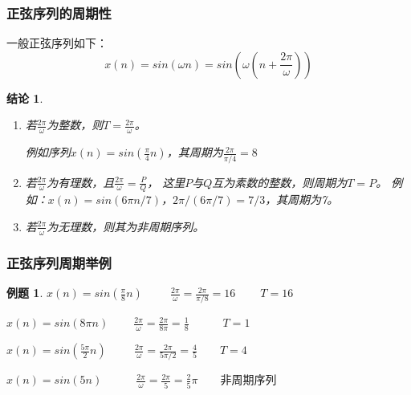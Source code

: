 \documentclass[notheorems,compress,mathserif,table]{beamer}
\newtheorem{example}{例题}
\newtheorem{jielun}{结论}
\begin{document}

\begin{frame}\frametitle{正弦序列的周期性}%
一般正弦序列如下：
$$x(n) = sin(\omega n) = sin(\omega(n+\frac{2\pi}{\omega}))$$
\begin{jielun}
\begin{enumerate}
  \item [(1)]
      若$\frac{2\pi}{\omega}$为整数，则$ T= \frac{2\pi}{\omega}$。
      \par 例如序列$x(n)=sin(\frac{\pi}{4}  n)$，其周期为$\frac{2\pi}{\pi/4}=8$
  \item [(2)]
      若$\frac{2\pi}{\omega}$为有理数，且$\frac{2\pi}{\omega}= \frac{P}{Q}$，
      这里$P$与$Q$互为素数的整数，则周期为$T=P$。
      例如：$x(n)=sin(6\pi n/7)$，$2\pi/(6\pi/7)=7/3$，其周期为7。
  \item [(3)]
      若$\frac{2\pi}{\omega}$为无理数，则其为非周期序列。
\end{enumerate}
\end{jielun}
\end{frame}



\begin{frame}\frametitle{正弦序列周期举例}%
\begin{example}

$x(n) = sin(\frac{\pi}{8}n)\:\:\quad\quad \frac{2\pi}{\omega} =\frac{2\pi}{\pi/8}=16           \:\quad\quad T = 16  $
\par\quad\newline\quad
$x(n) = sin(8\pi n)        \quad\:\quad \frac{2\pi}{\omega} =\frac{2\pi}{8\pi}= \frac{1}{8}    \qquad\quad T = 1  $
\par\quad\newline\quad
$x(n) = sin(\frac{5\pi}{2}n) \quad\:\:\quad \frac{2\pi}{\omega} =\frac{2\pi}{5\pi/2}=\frac{4}{5} \quad\quad T = 4  $
\par\quad\newline\quad
$x(n) = sin(5n)            \quad\quad\quad \frac{2\pi}{\omega} =\frac{2\pi}{5}=\frac{2}{5}\pi      \quad\quad\mbox{非周期序列}$
\end{example}
\end{frame}
\end{document}
